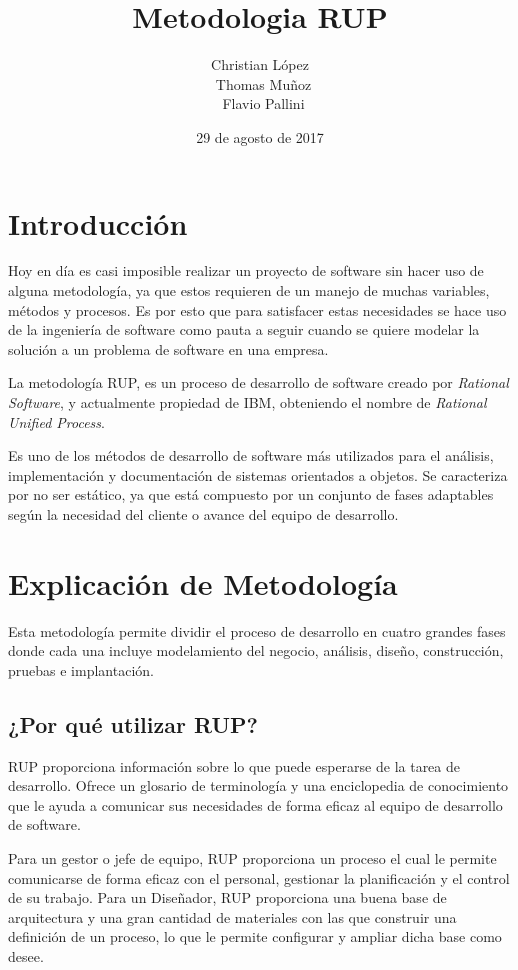 \documentclass[spanish]{udpreport}
\title{Metodologia RUP}
\author{Christian López \\ Thomas Muñoz \\ Flavio Pallini}
\date{29 de agosto de 2017}
\begin{document}
\maketitle

\tableofcontents
\listoffigures

\chapter{Introducción}
Hoy en día es casi imposible realizar un proyecto de software sin hacer uso de alguna metodología, ya que estos requieren de un manejo de muchas variables, métodos y procesos. Es por esto que para satisfacer estas necesidades se hace uso de la ingeniería de software como pauta a seguir cuando se quiere modelar la solución a un problema de software en una empresa.\par
La metodología RUP, es un proceso de desarrollo de software creado por \textit{Rational Software}, y actualmente propiedad de IBM, obteniendo el nombre de \textit{Rational Unified Process}.\par
Es uno de los métodos de desarrollo de software más utilizados para el análisis, implementación y documentación de sistemas orientados a objetos. Se caracteriza por no ser estático, ya que está compuesto por un conjunto de fases adaptables según la necesidad del cliente o avance del equipo de desarrollo.

\chapter{Explicación de Metodología}
Esta metodología permite dividir el proceso de desarrollo en cuatro grandes fases donde cada una incluye modelamiento del negocio, análisis, diseño, construcción, pruebas e implantación.

\section{¿Por qué utilizar RUP?}
\label{sec: Por que utilizar RUP}
RUP proporciona información sobre lo que puede esperarse de la tarea de desarrollo. Ofrece un glosario de terminología y una enciclopedia de conocimiento que le ayuda a comunicar sus necesidades de forma eficaz al equipo de  desarrollo de software. \par
Para un gestor o jefe de equipo, RUP proporciona  un proceso el cual le permite comunicarse de forma eficaz con el personal, gestionar la planificación y el control de su trabajo. Para un Diseñador, RUP proporciona una buena base de arquitectura y una gran cantidad de materiales con las que construir una definición de un proceso, lo que le permite configurar y ampliar dicha base como desee.
\end{document}
